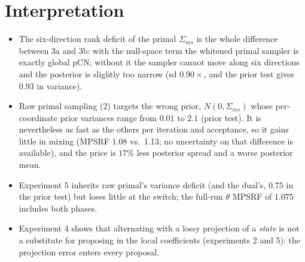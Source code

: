 \documentclass[11pt]{article}
\begin{document}
\section{Interpretation}
\begin{itemize}
\item The six-direction rank deficit of the primal $\Sigma_{ms}$ is the whole difference between 3a and 3b: with the null-space term the whitened primal sampler is exactly global pCN; without it the sampler cannot move along six directions and the posterior is slightly too narrow (sd $0.90\times$, and the prior test gives $0.93$ in variance).
\item Raw primal sampling (2) targets the wrong prior, $N(0,\Sigma_{ms})$ whose per-coordinate prior variances range from $0.01$ to $2.1$ (prior test). It is nevertheless as fast as the others per iteration and acceptance, so it gains little in mixing (MPSRF 1.08 vs.\ 1.13; no uncertainty on that difference is available), and the price is $17\%$ less posterior spread and a worse posterior mean.
\item Experiment 5 inherits raw primal's variance deficit (and the dual's, $0.75$ in the prior test) but loses little at the switch; the full-run $\theta$ MPSRF of $1.075$ includes both phases.
\item Experiment 4 shows that alternating with a lossy projection of a \emph{state} is not a substitute for proposing in the local coefficients (experiments 2 and 5): the projection error enters every proposal.
\end{itemize}
\end{document}
